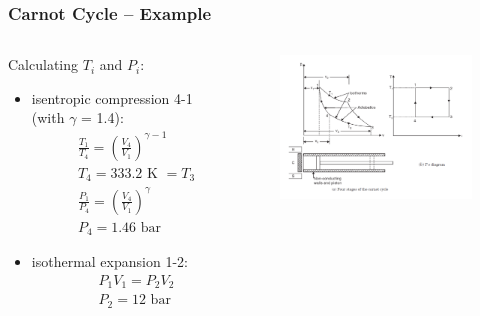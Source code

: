 \documentclass[10pt,compress]{beamer}
\begin{document}
\begin{frame}
 \frametitle{Carnot Cycle -- Example}
  \begin{columns}
   \begin{column}[c]{0.4\linewidth}
    Calculating $T_{i}$ and $P_{i}$:
    \begin{itemize}
     \item <2-> isentropic compression 4-1 (with $\gamma$ = 1.4):
      \begin{eqnarray}
       && \displaystyle\frac{T_{1}}{T_{4}}=\left(\displaystyle\frac{V_{4}}{V_{1}}\right)^{\gamma-1} \nonumber \\
       && T_{4}=333.2\text{ K } = T_{3} \nonumber \\
       && \displaystyle\frac{P_{1}}{P_{4}}=\left(\displaystyle\frac{V_{4}}{V_{1}}\right)^{\gamma} \nonumber \\
       && P_{4}=1.46\text{ bar }\nonumber
      \end{eqnarray}
     \item <3-> isothermal expansion 1-2:
      \begin{eqnarray}
       && P_{1}V_{1}=P_{2}V_{2} \nonumber \\
       && P_{2}=12\text{ bar} \nonumber
      \end{eqnarray}
    \end{itemize}
    \end{column}
    \begin{column}[c]{0.6\linewidth}
     \begin{figure}%
      \begin{center}
     \includegraphics[width=7.5cm,clip]{./Pics/GasCycle_CarnotCycle}
    \end{center}
   \end{figure}  
  \end{column}  
 \end{columns}
\end{frame}
\end{document}
